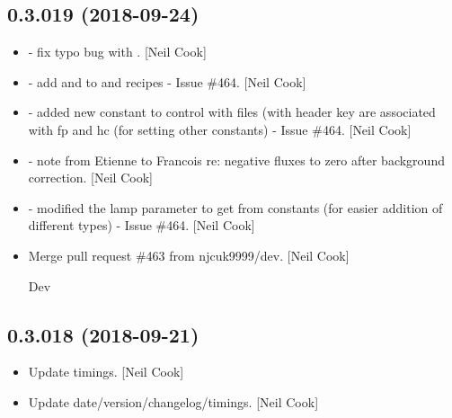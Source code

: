 \documentclass[a4paper,10pt,english]{report}
\begin{document}
\subsection{0.3.019 (2018-09-24)}
\label{\detokenize{misc/changelog:id312}}\begin{itemize}
\item {} 
 - fix typo bug with
. {[}Neil Cook{]}

\item {} 
 - add  and  to  and
 recipes - Issue \#464. {[}Neil Cook{]}

\item {} 
 - added new constant to control with files
(with header key  are associated with fp and hc (for
setting other constants) - Issue \#464. {[}Neil Cook{]}

\item {} 
 - note from Etienne to Francois re: negative
fluxes to zero after background correction. {[}Neil Cook{]}

\item {} 
 - modified the lamp parameter to get from
constants (for easier addition of different types) - Issue \#464. {[}Neil
Cook{]}

\item {} 
Merge pull request \#463 from njcuk9999/dev. {[}Neil Cook{]}

Dev

\end{itemize}


\subsection{0.3.018 (2018-09-21)}
\label{\detokenize{misc/changelog:id313}}\begin{itemize}
\item {} 
Update timings. {[}Neil Cook{]}

\item {} 
Update date/version/changelog/timings. {[}Neil Cook{]}

\end{itemize}
\end{document}
